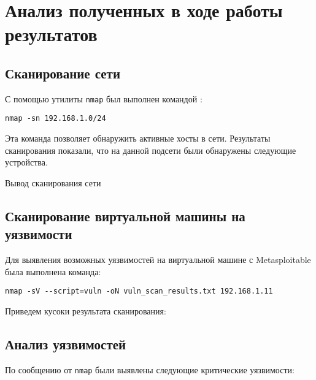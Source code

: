 \section{Анализ полученных в ходе работы результатов}

\subsection{Сканирование сети}

С помощью утилиты \texttt{nmap} был выполнен командой :

\begin{verbatim}
nmap -sn 192.168.1.0/24
\end{verbatim}

Эта команда позволяет обнаружить активные хосты в сети.
Результаты сканирования показали,
что на данной подсети были обнаружены следующие устройства.

\begin{image}
    \caption{Вывод сканирования сети}
    \label{fig:nmap:sn}
\end{image}

\subsection{Сканирование виртуальной машины на уязвимости}

Для выявления возможных уязвимостей на виртуальной машине с Metasploitable
была выполнена команда:

\begin{verbatim}
nmap -sV --script=vuln -oN vuln_scan_results.txt 192.168.1.11
\end{verbatim}

Приведем кусоки результата сканирования:





\subsection{Анализ уязвимостей}

По сообщению от \texttt{nmap} были выявлены следующие критические уязвимости:

